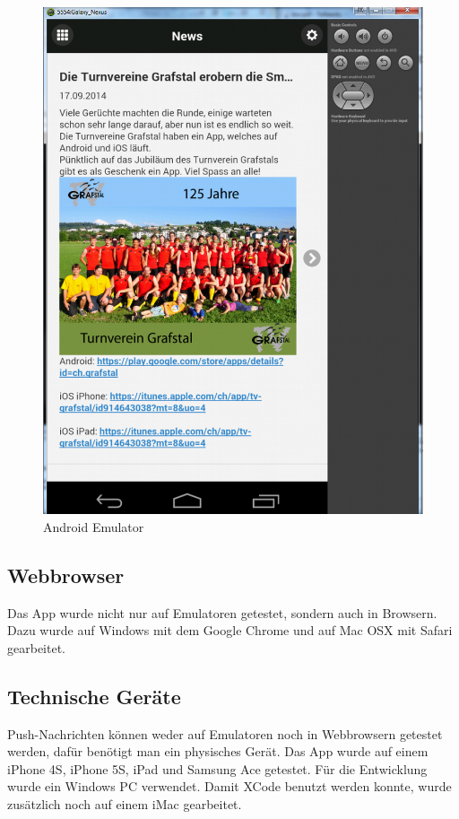 \begin{figure}[h]
\centering
\includegraphics[scale=0.25]{images/android_emulator.png}
\caption{Android Emulator}
\label{fig:android_emulator}
\end{figure}

\FloatBarrier
\subsection{Webbrowser}
Das App wurde nicht nur auf Emulatoren getestet, sondern auch in Browsern. Dazu wurde auf Windows mit dem Google Chrome und auf Mac OSX mit Safari gearbeitet.

\subsection{Technische Geräte}
Push-Nachrichten können weder auf Emulatoren noch in Webbrowsern getestet werden, dafür benötigt man ein physisches Gerät. Das App wurde auf einem iPhone 4S, iPhone 5S, iPad und Samsung Ace getestet. Für die Entwicklung wurde ein Windows PC verwendet. Damit XCode benutzt werden konnte, wurde zusätzlich noch auf einem iMac gearbeitet.

